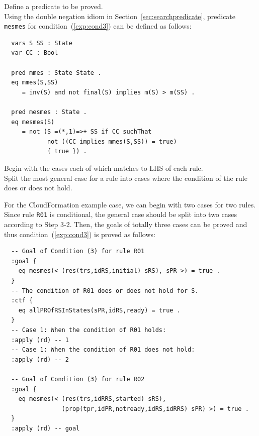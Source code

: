 \documentclass[12pt]{report}
\begin{document}
 Define a predicate to be proved.\\ Using the
double negation idiom in Section~\ref{sec:searchpredicate}, predicate
{\tt mesmes} for condition~(\ref{exp:cond3}) can be defined as follows:
\small
\begin{verbatim}
  vars S SS : State
  var CC : Bool

  pred mmes : State State .
  eq mmes(S,SS)
     = inv(S) and not final(S) implies m(S) > m(SS) .

  pred mesmes : State .
  eq mesmes(S)
     = not (S =(*,1)=>+ SS if CC suchThat
            not ((CC implies mmes(S,SS)) = true)
            { true }) .
\end{verbatim}
\normalsize

\vspace{0.3cm}
 Begin with the cases each of which matches to
LHS of each rule. \\ 
 Split the most general case for a rule into
cases where the condition of the rule does or does not hold. 

For the CloudFormation example case, we can begin with two cases for
two rules. Since rule {\tt R01} is conditional, the general case
should be split into two cases according to Step 3-2. Then, the goals
of totally three cases can be proved and thus
condition~(\ref{exp:cond3}) is proved as follows:
\small
\begin{verbatim}
  -- Goal of Condition (3) for rule R01
  :goal {
    eq mesmes(< (res(trs,idRS,initial) sRS), sPR >) = true .
  }
  -- The condition of R01 does or does not hold for S.
  :ctf {
    eq allPROfRSInStates(sPR,idRS,ready) = true .
  }
  -- Case 1: When the condition of R01 holds:
  :apply (rd) -- 1
  -- Case 1: When the condition of R01 does not hold:
  :apply (rd) -- 2

  -- Goal of Condition (3) for rule R02
  :goal {
    eq mesmes(< (res(trs,idRRS,started) sRS),
                (prop(tpr,idPR,notready,idRS,idRRS) sPR) >) = true .
  }
  :apply (rd) -- goal

\end{verbatim}
\normalsize

\end{document}

